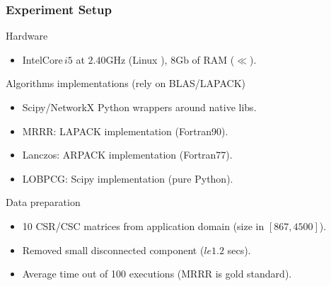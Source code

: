  \begin{frame}
  \frametitle{Experiment Setup}
  \begin{block}{Hardware}
    \begin{itemize}
    \item Intel\textregistered Core\texttrademark $\,i5$ at $2.40$GHz
      (Linux ), $8$Gb of RAM ($\ll$).
    \end{itemize}
  \end{block}
  \begin{block}{Algorithms implementations (rely on BLAS/LAPACK)}
    \begin{itemize}
    \item Scipy/NetworkX Python wrappers around native libs.
    \item MRRR: LAPACK implementation (Fortran90).
    \item Lanczos: ARPACK implementation (Fortran77).
    \item LOBPCG: Scipy implementation (pure Python).
    \end{itemize}
  \end{block}
  \begin{block}{Data preparation}
    \begin{itemize}
    \item 10 CSR/CSC matrices from application domain (size in $[867,4500]$).
    \item Removed small disconnected component ($le 1.2$ secs).
    \item Average time out of 100 executions (MRRR is gold standard).
    \end{itemize}
  \end{block}    
\end{frame}
